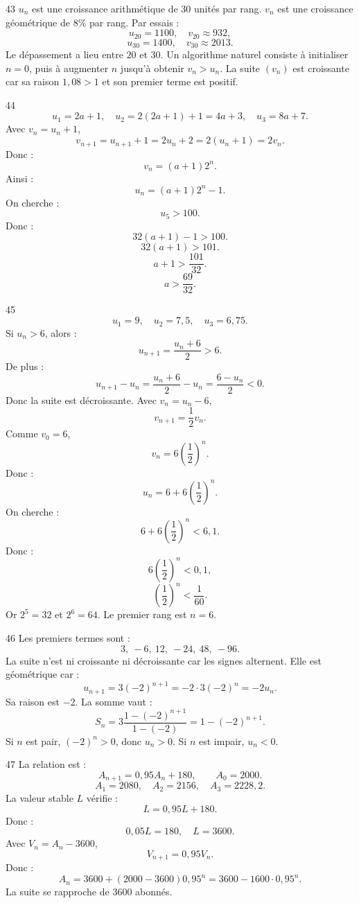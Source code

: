 \documentclass[11pt,a4paper]{article}
\begin{document}
\begin{solbox}{43}
\(u_n\) est une croissance arithmétique de \(30\) unités par rang.  
\(v_n\) est une croissance géométrique de \(8\%\) par rang.  
Par essais :
\[
u_{20}=1100,\quad v_{20}\approx932,
\]
\[
u_{30}=1400,\quad v_{30}\approx2013.
\]
Le dépassement a lieu entre \(20\) et \(30\). Un algorithme naturel consiste à initialiser \(n=0\), puis à augmenter \(n\) jusqu'à obtenir \(v_n>u_n\).  
La suite \((v_n)\) est croissante car sa raison \(1{,}08>1\) et son premier terme est positif.
\end{solbox}

\begin{solbox}{44}
\[
u_1=2a+1,\quad u_2=2(2a+1)+1=4a+3,\quad u_3=8a+7.
\]
Avec \(v_n=u_n+1\),
\[
v_{n+1}=u_{n+1}+1=2u_n+2=2(u_n+1)=2v_n.
\]
Donc :
\[
v_n=(a+1)2^n.
\]
Ainsi :
\[
u_n=(a+1)2^n-1.
\]
On cherche :
\[
u_5>100.
\]
Donc :
\[
32(a+1)-1>100.
\]
\[
32(a+1)>101.
\]
\[
a+1>\frac{101}{32}.
\]
\[
a>\frac{69}{32}.
\]
\end{solbox}

\begin{solbox}{45}
\[
u_1=9,\quad u_2=7{,}5,\quad u_3=6{,}75.
\]
Si \(u_n>6\), alors :
\[
u_{n+1}=\frac{u_n+6}{2}>6.
\]
De plus :
\[
u_{n+1}-u_n=\frac{u_n+6}{2}-u_n=\frac{6-u_n}{2}<0.
\]
Donc la suite est décroissante.  
Avec \(v_n=u_n-6\),
\[
v_{n+1}=\frac12v_n.
\]
Comme \(v_0=6\),
\[
v_n=6\left(\frac12\right)^n.
\]
Donc :
\[
u_n=6+6\left(\frac12\right)^n.
\]
On cherche :
\[
6+6\left(\frac12\right)^n<6{,}1.
\]
Donc :
\[
6\left(\frac12\right)^n<0{,}1,
\]
\[
\left(\frac12\right)^n<\frac1{60}.
\]
Or \(2^5=32\) et \(2^6=64\). Le premier rang est \(n=6\).
\end{solbox}

\begin{solbox}{46}
Les premiers termes sont :
\[
3,\ -6,\ 12,\ -24,\ 48,\ -96.
\]
La suite n'est ni croissante ni décroissante car les signes alternent.  
Elle est géométrique car :
\[
u_{n+1}=3(-2)^{n+1}=-2\cdot3(-2)^n=-2u_n.
\]
Sa raison est \(-2\).  
La somme vaut :
\[
S_n=3\frac{1-(-2)^{n+1}}{1-(-2)}
=1-(-2)^{n+1}.
\]
Si \(n\) est pair, \((-2)^n>0\), donc \(u_n>0\). Si \(n\) est impair, \(u_n<0\).
\end{solbox}

\begin{solbox}{47}
La relation est :
\[
A_{n+1}=0{,}95A_n+180,\qquad A_0=2000.
\]
\[
A_1=2080,\quad A_2=2156,\quad A_3=2228{,}2.
\]
La valeur stable \(L\) vérifie :
\[
L=0{,}95L+180.
\]
Donc :
\[
0{,}05L=180,\quad L=3600.
\]
Avec \(V_n=A_n-3600\),
\[
V_{n+1}=0{,}95V_n.
\]
Donc :
\[
A_n=3600+(2000-3600)0{,}95^n
=3600-1600\cdot0{,}95^n.
\]
La suite se rapproche de \(3600\) abonnés.
\end{solbox}
\end{document}

